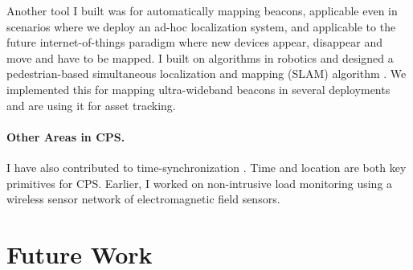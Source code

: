 \documentclass[10pt]{article}
\begin{document}
Another tool I built was for automatically mapping beacons, applicable even in scenarios where we deploy an ad-hoc localization system, and applicable to the future internet-of-things paradigm where new devices appear, disappear and move and have to be mapped. %
I built on algorithms in robotics and designed a pedestrian-based simultaneous localization and mapping (SLAM) algorithm \cite{mobileAR}. We implemented this for mapping ultra-wideband beacons in several deployments and are using it for asset tracking.


\paragraph{Other Areas in CPS. }
I have also contributed to time-synchronization \cite{buevich2013hardware, dongare2017pulsar}. Time and location are both key primitives for CPS. 
Earlier, I worked on non-intrusive load monitoring \cite{rajagopal2013magnetic, rajagopal2013demo} using a wireless sensor network of electromagnetic field sensors. 

\section{Future Work}

\end{document}
